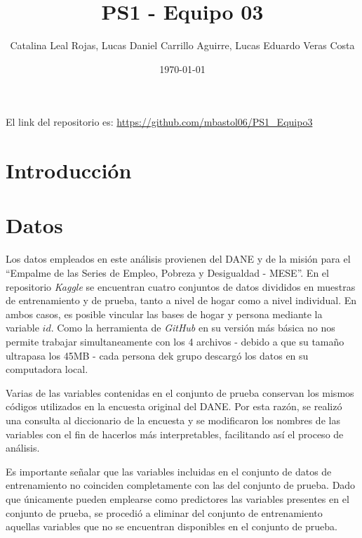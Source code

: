\documentclass[12pt,a4paper,onecolumn]{article}
\title{PS1 - Equipo 03}
\author{Catalina Leal Rojas, Lucas Daniel Carrillo Aguirre, Lucas Eduardo Veras Costa}
\date{\today}
\begin{document}
\maketitle

\thispagestyle{empty} %

%

El link del repositorio es: \url{https://github.com/mbastol06/PS1_Equipo3}





\section{Introducción} \label{sec:intro}



\section{Datos} \label{sec:datos}
Los datos empleados en este análisis provienen del DANE y de la misión para el ``Empalme de las Series de Empleo, Pobreza y Desigualdad - MESE''. En el repositorio \textit{Kaggle} se encuentran cuatro conjuntos de datos divididos en muestras de entrenamiento y de prueba, tanto a nivel de hogar como a nivel individual. En ambos casos, es posible vincular las bases de hogar y persona mediante la variable $id$. Como la herramienta de \textit{GitHub} en su versión más básica no nos permite trabajar simultaneamente con los 4 archivos - debido a que su tamaño ultrapasa los 45MB - cada persona dek grupo descargó los datos en su computadora local.  

Varias de las variables contenidas en el conjunto de prueba conservan los mismos códigos utilizados en la encuesta original del DANE. Por esta razón, se realizó una consulta al diccionario de la encuesta y se modificaron los nombres de las variables con el fin de hacerlos más interpretables, facilitando así el proceso de análisis.  

Es importante señalar que las variables incluidas en el conjunto de datos de entrenamiento no coinciden completamente con las del conjunto de prueba. Dado que únicamente pueden emplearse como predictores las variables presentes en el conjunto de prueba, se procedió a eliminar del conjunto de entrenamiento aquellas variables que no se encuentran disponibles en el conjunto de prueba.
\end{document}
